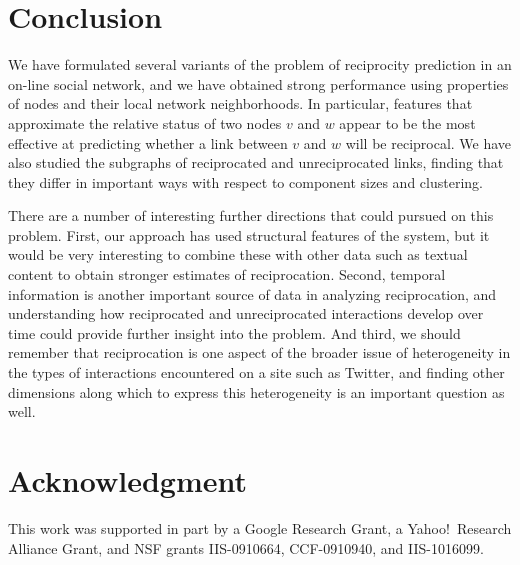 \documentclass[conference]{IEEEtran}
\begin{document}
\section{Conclusion}

We have formulated several variants of the problem of 
reciprocity prediction in an on-line social network, and we
have obtained strong performance
using properties of nodes and their local network neighborhoods.
In particular, features that approximate the relative status of
two nodes $v$ and $w$ appear to be the most effective at 
predicting whether a link between $v$ and $w$ will be reciprocal.
We have also studied the subgraphs of reciprocated and unreciprocated
links, finding that they differ in important ways with respect
to component sizes and clustering.

There are a number of interesting further directions that could
pursued on this problem.
First, our approach has used structural features of the system,
but it would be very interesting to combine these with other
data such as textual content to obtain
stronger estimates of reciprocation.
Second, temporal information is another important source of data
in analyzing reciprocation, and understanding how reciprocated
and unreciprocated interactions develop over time could provide
further insight into the problem.
And third, we should remember that reciprocation is one aspect of
the broader issue of heterogeneity in the types of interactions
encountered on a site such as Twitter, and finding other
dimensions along which to express this heterogeneity is an 
important question as well.


 \section*{Acknowledgment}
This work was supported in part by a Google Research Grant, a Yahoo!~Research Alliance Grant, and NSF grants IIS-0910664, CCF-0910940, and IIS-1016099. 




\end{document}
